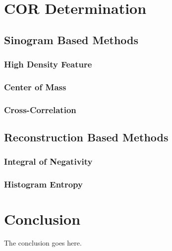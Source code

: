 \documentclass[10pt,journal,compsoc]{IEEEtran}
\begin{document}
\section{COR Determination}

\subsection{Sinogram Based Methods}

\subsubsection{High Density Feature}

\subsubsection{Center of Mass}

\subsubsection{Cross-Correlation}

\subsection{Reconstruction Based Methods}

\subsubsection{Integral of Negativity}

\subsubsection{Histogram Entropy}

\section{Conclusion}
The conclusion goes here.





\end{document}
